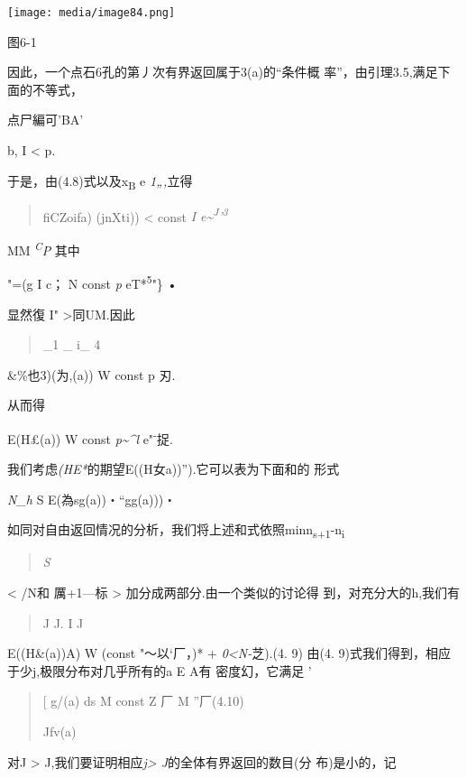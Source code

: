 \texttt{[image: media/image84.png]}

图6-1

因此，一个点石6孔的第丿次有界返回属于3(a)的``条件概
率''，由引理3.5,满足下面的不等式，

点尸編可'BA'

b, I \textless{} p.

于是，由(4.8)式以及x\textsubscript{B} e \emph{1„,}立得

\begin{quote}
fiCZoifa) (jnXti)) \textless{} const \emph{I
e\textasciitilde{}\textsuperscript{J}'\textsuperscript{3}}
\end{quote}

MM \emph{\textsuperscript{C}P} 其中

"=(g I c； N const \emph{p} eT*\textsuperscript{5}"\} •

显然復\textbar{} I" \textgreater{}同UM.因此

\begin{quote}
\_1 \_ i\_ 4
\end{quote}

\&\%也3)(为,(a)) W const p 刃.

从而得

E(H£(a)) W const \emph{p\textasciitilde{}\^{}l} e"\textsuperscript{-}捉.

我们考虑\emph{(HE*}的期望E((H女a))'').它可以表为下面和的 形式

\emph{N\_h} S E(為sg(a))・``gg(a)))・

如同对自由返回情况的分析，我们将上述和式依照min\textbar{}n\textsubscript{s+1}-n\textsubscript{i}\textbar{}

\begin{quote}
\emph{S}
\end{quote}

\textless{} /N和 厲+1---标 \textgreater{}
加分成两部分.由一个类似的讨论得 到，对充分大的h,我们有

\begin{quote}
J J. I J
\end{quote}

E((H\&(a))A) W (const "〜以`厂，)* + \emph{0\textless{}N-}芝).(4. 9)
由(4. 9)式我们得到，相应于少j,极限分布对几乎所有的a E A有 密度幻，它满足
'

\begin{quote}
{[} g/(a) ds M const Z 厂 M ''厂(4.10)

Jfv(a)
\end{quote}

对J \textgreater{} J,我们要证明相应\emph{j\textgreater{}
J}的全体有界返回的数目(分 布)是小的，记

